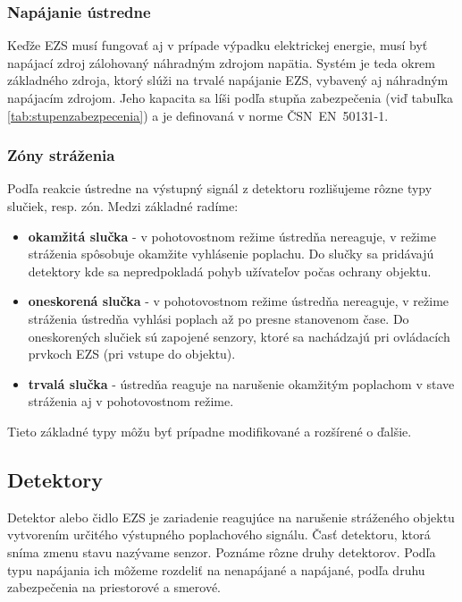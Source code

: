 \subsubsection{Napájanie ústredne}

Keďže EZS musí fungovať aj v prípade výpadku elektrickej energie, musí byť napájací zdroj zálohovaný náhradným zdrojom napätia. Systém je teda okrem základného zdroja, ktorý slúži na trvalé napájanie EZS, vybavený aj náhradným napájacím zdrojom. Jeho kapacita sa líši podľa stupňa zabezpečenia (viď tabuľka \ref{tab:stupenzabezpecenia}) a je definovaná v norme ČSN~EN~50131-1.

\subsubsection{Zóny stráženia}

Podľa reakcie ústredne na výstupný signál z detektoru rozlišujeme rôzne typy slučiek, resp. zón. Medzi základné radíme:
\begin{itemize}
    \item \textbf{okamžitá slučka} - v pohotovostnom režime ústredňa nereaguje, v režime stráženia spôsobuje okamžite vyhlásenie poplachu. Do slučky sa pridávajú detektory kde sa nepredpokladá pohyb užívateľov počas ochrany objektu.
    \item \textbf{oneskorená slučka} - v pohotovostnom režime ústredňa nereaguje, v režime stráženia ústredňa vyhlási poplach až po presne stanovenom čase. Do oneskorených slučiek sú zapojené senzory, ktoré sa nachádzajú pri ovládacích prvkoch EZS (pri vstupe do objektu).
    \item \textbf{trvalá slučka} - ústredňa reaguje na narušenie okamžitým poplachom v stave stráženia aj v pohotovostnom režime.
\end{itemize}
Tieto základné typy môžu byť prípadne modifikované a rozšírené o ďalšie.\cite{velas_ezs}

\subsection{Detektory}

Detektor alebo čidlo EZS je zariadenie reagujúce na narušenie stráženého objektu vytvorením určitého výstupného poplachového signálu. Časť detektoru, ktorá sníma zmenu stavu nazývame senzor. Poznáme rôzne druhy detektorov. Podľa typu napájania ich môžeme rozdeliť na nenapájané a napájané, podľa druhu zabezpečenia na priestorové a smerové.

